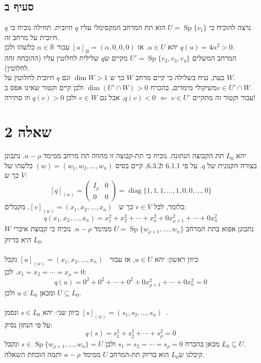 \documentclass{article}
\def\reals{\mathbb{R}}
\DeclareMathOperator{\tra}{^t}
\DeclareMathOperator{\Sp}{Sp}
\DeclareMathOperator{\diag}{diag}
\begin{document}
\subsection*{סעיף ב}

נרצה להוכיח כי $U=\Sp\{ v_1 \}$ הוא תת המרחב המקסימלי עליו $q$ חיובית. תחילה נוכיח כי $q$ חיובית על מרחב זה. \\
יהא $u\in U$, אז $[u]_B=(\alpha, 0, 0, 0)$ עבור $\alpha\in \reals$ כלשהו ולכן $q(u)=4\alpha^2>0$. \\
המרחב המשלים $U'=\Sp\{ v_2, v_3, v_4 \}$ מקיים ש$q$ שלילית לחלוטין עליו (ההוכחה זהה לחלוטין).\\
כעת, נניח בשלילה כי קיים מרחב $W$ כך ש $\dim W > 1$ וגם $q$ חיובית לחלוטין על $W$. \\
משיקולי מימדים, בהכרח $\dim (U'\cap W)>0$ ולכן קיים וקטור שאינו אפס ב$v\in U'\cap W$. \\
עבור וקטור זה מתקיים $v\in U'$ $\Leftarrow$ $q(v)<0$, אבל גם $v\in W$ ולכן $q(v)>0$ וזו סתירה!

\pagebreak

\section*{שאלה 2}

יהא $L_0$ תת הקבוצה הנתונה. נוכיח כי תת-קבוצה זו מהווה תת מרחב ממימד $n-\rho$.
נתבונן בצורה הקנונית של $q$. על פי 6.1.1 ו6.3.2, קיים בסיס $(w)=(w_1, w_2, ..., w_n)$ כלשהו של $V$ כך ש:
\[
    [q]_{(w)} = \begin{pmatrix}
        I_{\rho} & 0 \\
        0        & 0
    \end{pmatrix} = \diag\{1, 1, 1, ..., 1, 0, 0, ..., 0\}
\]
כלומר, לכל $v\in V$ כך ש $[v]_{(w)}=(x_1, x_2, ..., x_n)\tra$, מקבלים:
\[
    q(x_1, x_2, ..., x_n) = x_1^2+x_2^2+\cdots+x_\rho^2+0x_{\rho+1}^2+\cdots+0x_n^2
\]
נתבונן אפוא בתת המרחב $U=\Sp\{ w_{\rho+1}, ..., w_n \}$ ממימד $n-\rho$. נוכיח כי קבוצת איברי $W$ היא בדיוק $L_0$.\\\\
כיוון ראשון: יהא $u\in U$, אז עבור $[u]_{(w)}=(x_1, x_2, ..., x_n)\tra$ נקבל $x_1=x_2=\cdots=x_\rho=0$. לכן:
\[
    q(u)=0^2+0^2+\cdots+0^2+0x_{\rho+1}^2+\cdots+0x_n^2=0
\]
ומכאן $u\in L_0$ ולכן $U\subseteq L_0$.\\\\
כיוון שני: יהא $s\in L_0$ ונסמן $[s]_{(w)}=(s_1, s_2, ..., s_n) \tra$. \\
על פי הנתון נסיק:
\[
    q(s)=s_1^2+s_2^2+\cdots+s_\rho^2=0
\]
מכאן בהכרח $s_1=s_2=\cdots=s_\rho=0$ ולכן $s\in \Sp\{  w_{\rho+1}, ..., w_n \}=U$ ונקבל $L_0\subseteq U$. \\
קיבלנו ש$L_0$ הוא בדיוק תת-המרחב $U$ ממימד $n-\rho$ ותמה הוכחת השאלה.
\end{document}

